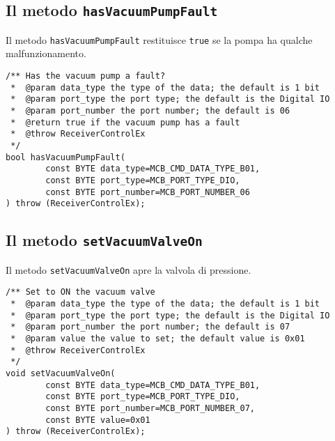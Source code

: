 \subsection{Il metodo \texttt{hasVacuumPumpFault}}
Il metodo \texttt{hasVacuumPumpFault} restituisce \texttt{true} se la pompa ha
qualche malfunzionamento.
\lstset{language=C++}
\begin{lstlisting}[caption={Dichiarazione del metodo \texttt{hasVacuumPumpFault}},
label=lst:hasVacuumPumpFault,mathescape]
/** Has the vacuum pump a fault?
 *  @param data_type the type of the data; the default is 1 bit
 *  @param port_type the port type; the default is the Digital IO
 *  @param port_number the port number; the default is 06
 *  @return true if the vacuum pump has a fault
 *  @throw ReceiverControlEx
 */
bool hasVacuumPumpFault(
        const BYTE data_type=MCB_CMD_DATA_TYPE_B01,
        const BYTE port_type=MCB_PORT_TYPE_DIO,
        const BYTE port_number=MCB_PORT_NUMBER_06
) throw (ReceiverControlEx);
\end{lstlisting}
\lstset{numbers=none}


\subsection{Il metodo \texttt{setVacuumValveOn}}
Il metodo \texttt{setVacuumValveOn} apre la valvola di pressione.
\lstset{language=C++}
\begin{lstlisting}[caption={Dichiarazione del metodo \texttt{setVacuumValveOn}},
label=lst:setVacuumValveOn,mathescape]
/** Set to ON the vacuum valve
 *  @param data_type the type of the data; the default is 1 bit
 *  @param port_type the port type; the default is the Digital IO
 *  @param port_number the port number; the default is 07
 *  @param value the value to set; the default value is 0x01
 *  @throw ReceiverControlEx
 */
void setVacuumValveOn(
        const BYTE data_type=MCB_CMD_DATA_TYPE_B01,
        const BYTE port_type=MCB_PORT_TYPE_DIO,
        const BYTE port_number=MCB_PORT_NUMBER_07,
        const BYTE value=0x01
) throw (ReceiverControlEx);
\end{lstlisting}
\lstset{numbers=none}


